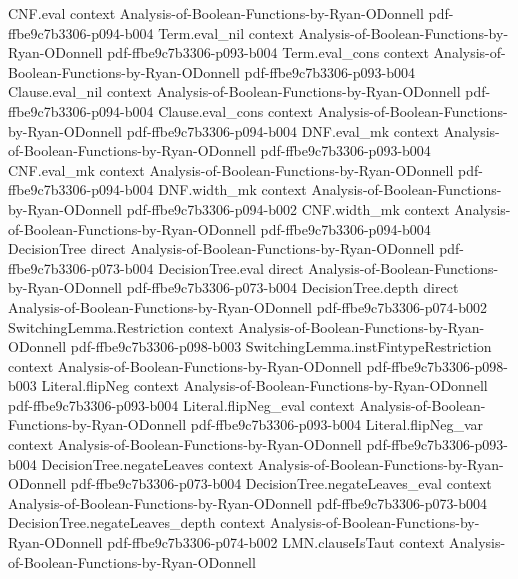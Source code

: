 \begin{lemma}
  {CNF.eval}
  {context}
  {Analysis-of-Boolean-Functions-by-Ryan-ODonnell}
  {pdf-ffbe9c7b3306-p094-b004}
\proofstep
  {Term.eval_nil}
  {context}
  {Analysis-of-Boolean-Functions-by-Ryan-ODonnell}
  {pdf-ffbe9c7b3306-p093-b004}
\proofstep
  {Term.eval_cons}
  {context}
  {Analysis-of-Boolean-Functions-by-Ryan-ODonnell}
  {pdf-ffbe9c7b3306-p093-b004}
\proofstep
  {Clause.eval_nil}
  {context}
  {Analysis-of-Boolean-Functions-by-Ryan-ODonnell}
  {pdf-ffbe9c7b3306-p094-b004}
\proofstep
  {Clause.eval_cons}
  {context}
  {Analysis-of-Boolean-Functions-by-Ryan-ODonnell}
  {pdf-ffbe9c7b3306-p094-b004}
\proofstep
  {DNF.eval_mk}
  {context}
  {Analysis-of-Boolean-Functions-by-Ryan-ODonnell}
  {pdf-ffbe9c7b3306-p093-b004}
\proofstep
  {CNF.eval_mk}
  {context}
  {Analysis-of-Boolean-Functions-by-Ryan-ODonnell}
  {pdf-ffbe9c7b3306-p094-b004}
\proofstep
  {DNF.width_mk}
  {context}
  {Analysis-of-Boolean-Functions-by-Ryan-ODonnell}
  {pdf-ffbe9c7b3306-p094-b002}
\proofstep
  {CNF.width_mk}
  {context}
  {Analysis-of-Boolean-Functions-by-Ryan-ODonnell}
  {pdf-ffbe9c7b3306-p094-b004}
\proofstep
  {DecisionTree}
  {direct}
  {Analysis-of-Boolean-Functions-by-Ryan-ODonnell}
  {pdf-ffbe9c7b3306-p073-b004}
\proofstep
  {DecisionTree.eval}
  {direct}
  {Analysis-of-Boolean-Functions-by-Ryan-ODonnell}
  {pdf-ffbe9c7b3306-p073-b004}
\proofstep
  {DecisionTree.depth}
  {direct}
  {Analysis-of-Boolean-Functions-by-Ryan-ODonnell}
  {pdf-ffbe9c7b3306-p074-b002}
\proofstep
  {SwitchingLemma.Restriction}
  {context}
  {Analysis-of-Boolean-Functions-by-Ryan-ODonnell}
  {pdf-ffbe9c7b3306-p098-b003}
\proofstep
  {SwitchingLemma.instFintypeRestriction}
  {context}
  {Analysis-of-Boolean-Functions-by-Ryan-ODonnell}
  {pdf-ffbe9c7b3306-p098-b003}
\proofstep
  {Literal.flipNeg}
  {context}
  {Analysis-of-Boolean-Functions-by-Ryan-ODonnell}
  {pdf-ffbe9c7b3306-p093-b004}
\proofstep
  {Literal.flipNeg_eval}
  {context}
  {Analysis-of-Boolean-Functions-by-Ryan-ODonnell}
  {pdf-ffbe9c7b3306-p093-b004}
\proofstep
  {Literal.flipNeg_var}
  {context}
  {Analysis-of-Boolean-Functions-by-Ryan-ODonnell}
  {pdf-ffbe9c7b3306-p093-b004}
\proofstep
  {DecisionTree.negateLeaves}
  {context}
  {Analysis-of-Boolean-Functions-by-Ryan-ODonnell}
  {pdf-ffbe9c7b3306-p073-b004}
\proofstep
  {DecisionTree.negateLeaves_eval}
  {context}
  {Analysis-of-Boolean-Functions-by-Ryan-ODonnell}
  {pdf-ffbe9c7b3306-p073-b004}
\proofstep
  {DecisionTree.negateLeaves_depth}
  {context}
  {Analysis-of-Boolean-Functions-by-Ryan-ODonnell}
  {pdf-ffbe9c7b3306-p074-b002}
\proofstep
  {LMN.clauseIsTaut}
  {context}
  {Analysis-of-Boolean-Functions-by-Ryan-ODonnell}

\end{lemma}

